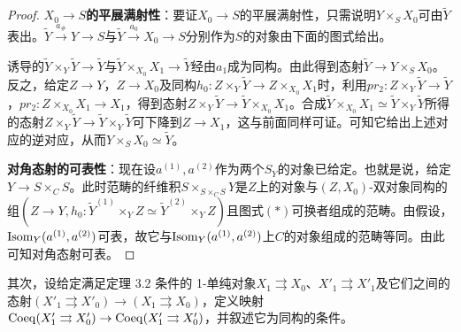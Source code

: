 \begin{proof}
\textbf{$X_0\to S$的平展满射性}：要证$X_0\to S$的平展满射性，只需说明$Y\times_SX_0$可由$\tilde Y$表出。$\tilde Y\xrightarrow{a_\#}Y\to S$与$\tilde Y\xrightarrow{a_0}X_0\to S$分别作为$S$的对象由下面的图式给出。
\begin{center}
\end{center}
\begin{center}
\end{center}
诱导的$\tilde Y\times_Y\tilde Y\to\tilde Y$与$\tilde Y\times_{X_0}X_1\to\tilde Y$经由$a_1$成为同构。由此得到态射$\tilde Y\to Y\times_SX_0$。反之，给定$Z\to Y$，$Z\to X_0$及同构$h_0:Z\times_Y\tilde Y\to Z\times_{X_0}X_1$时，利用$pr_2:Z\times_Y\tilde Y\to\tilde Y$，$pr_2:Z\times_{X_0}X_1\to X_1$，得到态射$Z\times_Y\tilde Y\to\tilde Y\times_{X_0}X_1$。合成$\tilde Y\times_{X_0}X_1\simeq\tilde Y\times_Y\tilde Y$所得的态射$Z\times_Y\tilde Y\to\tilde Y\times_Y\tilde Y$可下降到$Z\to X_1$，这与前面同样可证。可知它给出上述对应的逆对应，从而$Y\times_SX_0\simeq\tilde Y$。

\textbf{对角态射的可表性}：现在设$a^{(1)},a^{(2)}$作为两个$S_Y$的对象已给定。也就是说，给定$Y\to S\times_CS$。此时范畴的纤维积$S\times_{S\times_CS}Y$是$Z$上的对象与$(Z,X_0)$-双对象同构的组$(Z\to Y,h_0:\tilde Y^{(1)}\times_YZ\simeq\tilde Y^{(2)}\times_YZ)$且图式$(*)$可换者组成的范畴。由假设，$\operatorname{Isom}_Y(a^{(1)},a^{(2)})$可表，故它与$\operatorname{Isom}_Y(a^{(1)},a^{(2)})$上$C$的对象组成的范畴等同。由此可知对角态射可表。
\end{proof}

其次，设给定满足定理 3.2 条件的 1-单纯对象$X_1\rightrightarrows X_0$、$X'_1\rightrightarrows X'_1$及它们之间的态射$(X'_1\rightrightarrows X'_0)\to(X_1\rightrightarrows X_0)$，定义映射$\operatorname{Coeq}(X'_1\rightrightarrows X'_0)\to\operatorname{Coeq}(X'_1\rightrightarrows X'_0)$，并叙述它为同构的条件。


